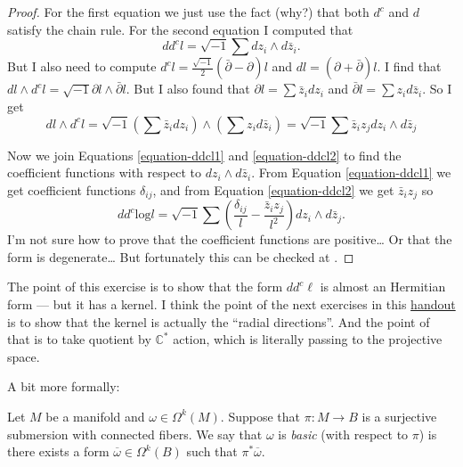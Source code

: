 \documentclass{book}
\begin{document}
\begin{proof}
For the first equation we just use the fact
(why?) that both $d^c$ and $d$ satisfy the
chain rule.
For the second equation I computed that
\begin{equation}
\label{equation-ddcl1}
dd^cl=\sqrt{-1}\sum dz_i\wedge d\bar{z}_i.
\end{equation}
But I also need to compute
$d^cl=\frac{\sqrt{-1}}{2}(\bar\partial-
\partial)l$
and $dl=(\partial+\bar\partial)l$.
I find that $dl \wedge d^cl=\sqrt{-1}\partial
l \wedge \bar\partial l$.
But I also found that
$\partial l=\sum \bar{z}_idz_i$ and
$\bar\partial l=\sum z_i d\bar{z}_i$.
So I get
\begin{equation}
\label{equation-ddcl2}
dl\wedge d^cl=\sqrt{-1}
\left(\sum \bar{z}_i dz_i\right)
\wedge
\left(\sum z_i d \bar{z}_i\right)
=\sqrt{-1}\sum\bar{z}_iz_jdz_i\wedge
d\bar{z}_j
\end{equation}

\noindent
Now we join Equations \ref{equation-ddcl1}
and \ref{equation-ddcl2}
to find the coefficient functions with
respect to $dz_i \wedge d\bar{z}_i$.
From Equation \ref{equation-ddcl1} we get
coefficient functions $\delta_{ij}$,
and from Equation \ref{equation-ddcl2} we get
$\bar{z}_iz_j$ so
$$
dd^c\text{log}l=\sqrt{-1}\sum
\left(\frac{\delta_{ij}}{l}
-\frac{\bar{z}_iz_j}{l^2}\right)
dz_i \wedge d\bar{z}_j.
$$
I'm not sure how to prove that  the
coefficient functions
are positive… Or that the form is degenerate…
But fortunately this can be checked at
\cite[p. 118]{huc}.
\end{proof}

\noindent
The point of this exercise is to show that
the form
$dd^c\ell$ is almost an Hermitian form ---
but it has a kernel.
I think the point of the next exercises in
this
\href{http://verbit.ru/IMPA/Surfaces-2025/%
assign-surfaces-2025-04.pdf}{
handout}
is to show that the kernel is actually
the ``radial directions''.
And the point of that is to take quotient
by $\mathbb{C}^*$ action, which is literally
passing to the projective space.

A bit more formally:

\begin{definition}
\label{definition-basic-form}
Let $M$ be a manifold and $\omega \in
\Omega^k(M)$.
Suppose that $\pi:M \to B$ is a surjective
submersion with connected fibers.
We say that $\omega$ is {\it basic} (with
respect
to $\pi$) is there exists a form
$\overline{\omega}\in \Omega^k(B)$ such that
$\pi^*  \overline{\omega}$.
\end{definition}
\end{document}
